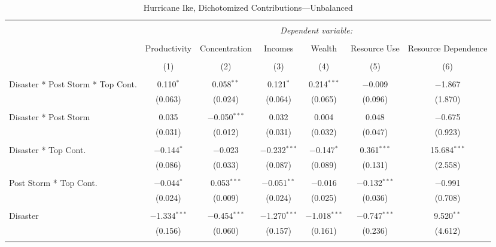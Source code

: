 
\begin{table}[!htbp] \centering 
  \caption{Hurricane Ike, Dichotomized Contributions---Unbalanced} 
  \label{} 
\footnotesize 
\begin{tabular}{@{\extracolsep{5pt}}lcccccc} 
\\[-1.8ex]\hline 
\hline \\[-1.8ex] 
 & \multicolumn{6}{c}{\textit{Dependent variable:}} \\ 
\cline{2-7} 
\\[-1.8ex] & Productivity & Concentration & Incomes & Wealth & Resource Use & Resource Dependence \\ 
\\[-1.8ex] & (1) & (2) & (3) & (4) & (5) & (6)\\ 
\hline \\[-1.8ex] 
 Disaster * Post Storm * Top Cont. & 0.110$^{*}$ & 0.058$^{**}$ & 0.121$^{*}$ & 0.214$^{***}$ & $-$0.009 & $-$1.867 \\ 
  & (0.063) & (0.024) & (0.064) & (0.065) & (0.096) & (1.870) \\ 
  & & & & & & \\ 
 Disaster * Post Storm & 0.035 & $-$0.050$^{***}$ & 0.032 & 0.004 & 0.048 & $-$0.675 \\ 
  & (0.031) & (0.012) & (0.031) & (0.032) & (0.047) & (0.923) \\ 
  & & & & & & \\ 
 Disaster * Top Cont. & $-$0.144$^{*}$ & $-$0.023 & $-$0.232$^{***}$ & $-$0.147$^{*}$ & 0.361$^{***}$ & 15.684$^{***}$ \\ 
  & (0.086) & (0.033) & (0.087) & (0.089) & (0.131) & (2.558) \\ 
  & & & & & & \\ 
 Post Storm *  Top Cont. & $-$0.044$^{*}$ & 0.053$^{***}$ & $-$0.051$^{**}$ & $-$0.016 & $-$0.132$^{***}$ & $-$0.991 \\ 
  & (0.024) & (0.009) & (0.024) & (0.025) & (0.036) & (0.708) \\ 
  & & & & & & \\ 
 Disaster & $-$1.334$^{***}$ & $-$0.454$^{***}$ & $-$1.270$^{***}$ & $-$1.018$^{***}$ & $-$0.747$^{***}$ & 9.520$^{**}$ \\ 
  & (0.156) & (0.060) & (0.157) & (0.161) & (0.236) & (4.612) \\ 
  & & & & & & \\ 

\end{tabular}
\end{table}
